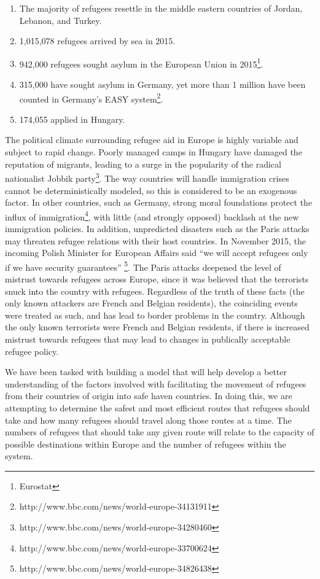 \documentclass{article}
\begin{document}
\begin{enumerate}
    \item The majority of refugees resettle in the middle eastern countries of Jordan, Lebanon, and Turkey.
    \item 1,015,078 refugees arrived by sea in 2015.
    \item 942,000 refugees sought asylum in the European Union in 2015\footnote{Eurostat}.
    \item 315,000 have sought asylum in Germany, yet more than 1 million have been counted in Germany's EASY system\footnote{http://www.bbc.com/news/world-europe-34131911}.
    \item 174,055 applied in Hungary.
\end{enumerate}

The political climate surrounding refugee aid in Europe is highly variable and subject to rapid change. Poorly managed camps in Hungary have damaged the reputation of migrants, leading to a surge in the popularity of the radical nationalist Jobbik party\footnote{http://www.bbc.com/news/world-europe-34280460}. The way countries will handle immigration crises cannot be deterministically modeled, so this is considered to be an exogenous factor. In other countries, such as Germany, strong moral foundations protect the influx of immigration\footnote{http://www.bbc.com/news/world-europe-33700624}, with little (and strongly opposed) backlash at the new immigration policies. In addition, unpredicted disasters such as the Paris attacks may threaten refugee relations with their host countries. In November 2015, the incoming Polish Minister for European Affairs said ``we will accept refugees only if we have security guarantees'' \footnote{http://www.bbc.com/news/world-europe-34826438}. The Paris attacks deepened the level of mistrust towards refugees across Europe, since it was believed that the terrorists snuck into the country with refugees. Regardless of the truth of these facts (the only known attackers are French and Belgian residents), the coinciding events were treated as such, and has lead to border problems in the country. Although the only known terrorists were French and Belgian residents, if there is increased mistrust towards refugees that may lead to changes in publically acceptable refugee policy.

We have been tasked with building a model that will help develop a better understanding of the factors involved with facilitating the movement of refugees from their countries of origin into safe haven countries. In doing this, we are attempting to determine the safest and most efficient routes that refugees should take and how many refugees should travel along those routes at a time. The numbers of refugees that should take any given route will relate to the capacity of possible destinations within Europe and the number of refugees within the system. 
\end{document}
